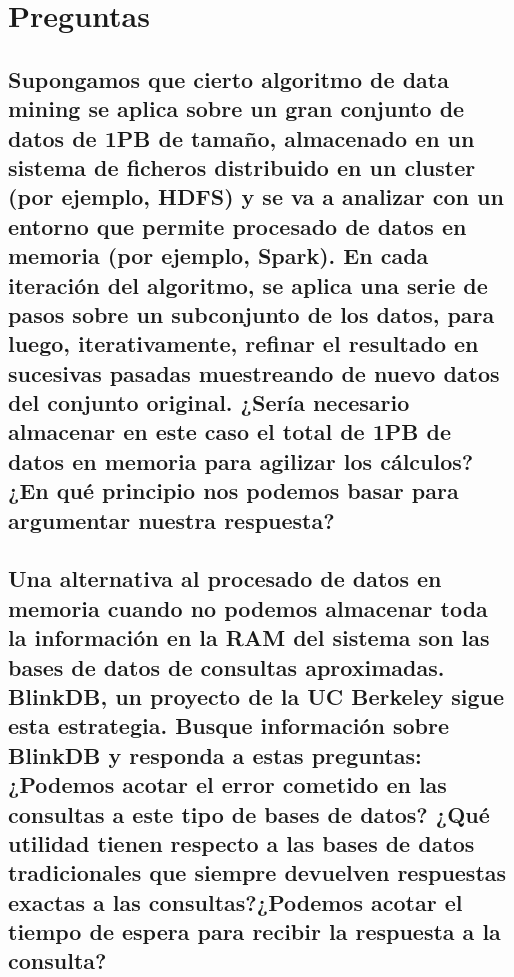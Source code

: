 \documentclass[12pt,a4paper,twoside,openright,titlepage,final]{article}
\author{José Ignacio Escribano}
\title{}
\begin{document}
\setcounter{page}{1}


\tableofcontents
\thispagestyle{empty}
\newpage

\setcounter{page}{1}


\section{Preguntas}

\subsection{Supongamos que cierto algoritmo de data mining se aplica sobre un gran conjunto de datos de 1PB de tamaño, almacenado en un sistema de ficheros distribuido en un cluster (por ejemplo, HDFS) y se va a analizar con un entorno que permite procesado de datos en memoria (por ejemplo, Spark). En cada iteración del algoritmo, se aplica una serie de pasos sobre un subconjunto de los datos, para luego, iterativamente, refinar el resultado en sucesivas pasadas muestreando de nuevo datos del conjunto original. ¿Sería necesario almacenar en este caso el total de 1PB de datos en memoria para agilizar los cálculos? ¿En qué principio nos podemos basar para argumentar nuestra respuesta?}



\subsection{Una alternativa al procesado de datos en memoria cuando no podemos almacenar toda la información en la RAM del sistema son las bases de datos de consultas aproximadas. BlinkDB, un proyecto de la UC Berkeley sigue esta estrategia. Busque información sobre BlinkDB y responda a estas preguntas: ¿Podemos acotar el error cometido en las consultas a este tipo de bases de datos? ¿Qué utilidad tienen respecto a las bases de datos tradicionales que siempre devuelven respuestas exactas a las consultas?¿Podemos acotar el tiempo de espera para recibir la respuesta a la consulta?}
\end{document}
